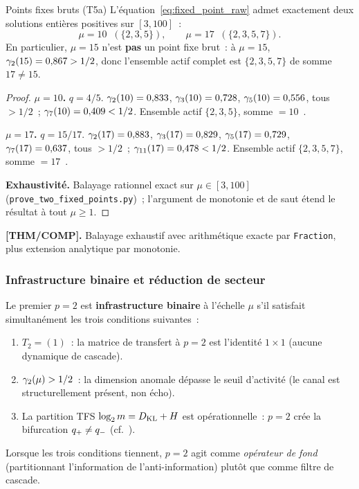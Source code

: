 \documentclass[12pt,a4paper]{article}
\begin{document}
\begin{thmbox}{Points fixes bruts (T5a)}
\label{thm:T5a}
L'équation~\eqref{eq:fixed_point_raw} admet exactement deux solutions
entières positives sur $[3, 100]$~:
\begin{equation}
  \mu = 10 \;\;(\{2,3,5\}), \qquad \mu = 17 \;\;(\{2,3,5,7\}).
  \label{eq:raw_fps}
\end{equation}
En particulier, $\mu = 15$ n'est \textbf{pas} un point fixe brut~:
à $\mu = 15$, $\gamma_{2}(15) = 0{,}867 > 1/2$, donc l'ensemble actif
complet est $\{2,3,5,7\}$ de somme $17 \neq 15$.

\begin{proof}
\textbf{$\mu = 10$.}
$q = 4/5$. $\gamma_{2}(10) = 0{,}833$, $\gamma_{3}(10) = 0{,}728$,
$\gamma_{5}(10) = 0{,}556$, tous $> 1/2$~; $\gamma_{7}(10) = 0{,}409 < 1/2$.
Ensemble actif $\{2,3,5\}$, somme $= 10$~\checkmark.

\textbf{$\mu = 17$.}
$q = 15/17$. $\gamma_{2}(17) = 0{,}883$, $\gamma_{3}(17) = 0{,}829$,
$\gamma_{5}(17) = 0{,}729$, $\gamma_{7}(17) = 0{,}637$, tous $> 1/2$~;
$\gamma_{11}(17) = 0{,}478 < 1/2$.
Ensemble actif $\{2,3,5,7\}$, somme $= 17$~\checkmark.

\textbf{Exhaustivité.}
Balayage rationnel exact sur $\mu \in [3, 100]$
(\texttt{prove\_two\_fixed\_points.py})~; l'argument de monotonie
et de saut étend le résultat à tout $\mu \geq 1$.
\end{proof}

\medskip\noindent\textbf{[THM/COMP].}\;
Balayage exhaustif avec arithmétique exacte par \texttt{Fraction},
plus extension analytique par monotonie.
\end{thmbox}

\subsubsection{Infrastructure binaire et réduction de secteur}
\label{sec:ch8_reduction}

\begin{definition}
\label{def:binary_infrastructure}
Le premier $p = 2$ est \textbf{infrastructure binaire} à l'échelle
$\mu$ s'il satisfait simultanément les trois conditions suivantes~:
\begin{enumerate}[nosep, label=(I\arabic*)]
\item \label{it:I1}
  $T_2 = (1)$~: la matrice de transfert à $p = 2$ est l'identité
  $1 \times 1$ (aucune dynamique de cascade).
\item \label{it:I2}
  $\gamma_{2}(\mu) > 1/2$~: la dimension anomale dépasse le seuil
  d'activité (le canal est structurellement présent, non écho).
\item \label{it:I3}
  La partition TFS $\log_2 m = D_{\mathrm{KL}} + H$ est opérationnelle~:
  $p = 2$ crée la bifurcation $q_{+} \neq q_{-}$
  (cf.~\cite{companion_M1}).
\end{enumerate}
Lorsque les trois conditions tiennent, $p = 2$ agit comme
\emph{opérateur de fond} (partitionnant l'information de
l'anti-information) plutôt que comme filtre de cascade.
\end{definition}
\end{document}
